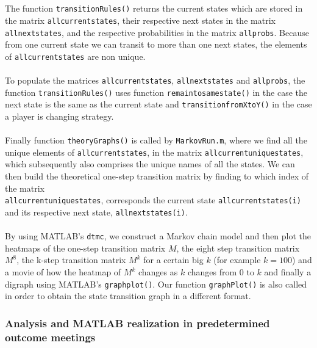 \documentclass[12pt]{report}
\begin{document}
\\\\
The function \texttt{transitionRules()} returns the current states which are stored in the matrix \texttt{allcurrentstates}, their respective next states in the matrix \texttt{allnextstates}, and the respective probabilities in the matrix \texttt{allprobs}. Because from one current state we can transit to more than one next states, the elements of \texttt{allcurrentstates} are non unique.
\\\\
To populate the matrices \texttt{allcurrentstates}, \texttt{allnextstates} and \texttt{allprobs}, the function \texttt{transitionRules()} uses function \texttt{remaintosamestate()} in the case the next state is the same as the current state and \texttt{transitionfromXtoY()} in the case a player is changing strategy.
\\\\
Finally function \texttt{theoryGraphs()} is called by \texttt{MarkovRun.m}, where we find all the unique elements of \texttt{allcurrentstates}, in the matrix \texttt{allcurrentuniquestates}, which subsequently also comprises the unique names of all the states. We can then build the theoretical one-step transition matrix by finding to which index of the matrix 
\\
\texttt{allcurrentuniquestates}, corresponds the current state \texttt{allcurrentstates(i)} and its respective next state, \texttt{allnextstates(i)}.
\\\\
By using MATLAB's \texttt{dtmc}, we construct a Markov chain model and then plot the heatmaps of the one-step transition matrix $M$, the eight step transition matrix $M^8$, the k-step transition matrix $M^k$ for a certain big $k$ (for example $k=100$) and a movie of how the heatmap of $M^k$ changes as $k$ changes from $0$ to $k$ and finally a digraph using MATLAB's \texttt{graphplot()}. Our function \texttt{graphPlot()} is also called in order to obtain the state transition graph in a different format.






\subsubsection{Analysis and MATLAB realization in predetermined outcome meetings}\label{predetermined}
\end{document}
